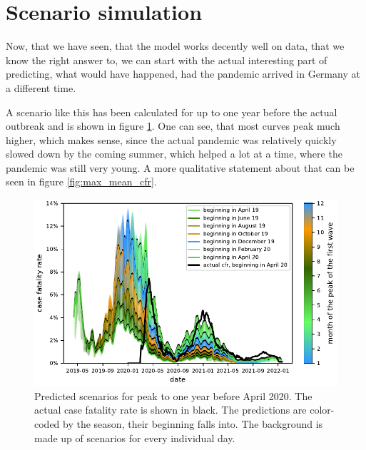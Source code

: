 \documentclass{article}
\begin{document}

\section{Scenario simulation}

Now, that we have seen, that the model works decently well on data, that we know the right answer to, we can start with the actual interesting part of predicting, what would have happened, had the pandemic arrived in Germany at a different time. 

A scenario like this has been calculated for up to one year before the actual outbreak and is shown in figure \ref{fig:cfr_timeseries}. One can see, that most curves peak much higher, which makes sense, since the actual pandemic was relatively quickly slowed down by the coming summer, which helped a lot at a time, where the pandemic was still very young. A more qualitative statement about that can be seen in figure \ref{fig:max_mean_cfr}. 

\begin{figure}[hbt!]
  \begin{center}
    \includegraphics{../fig/CfrTimeseries.pdf}
    \caption{Predicted scenarios for peak to one year before April 2020. The actual case fatality rate is shown in black. The predictions are color-coded by the season, their beginning falls into. The background is made up of scenarios for every individual day.}
    \label{fig:cfr_timeseries}
  \end{center}
\end{figure}
\end{document}
